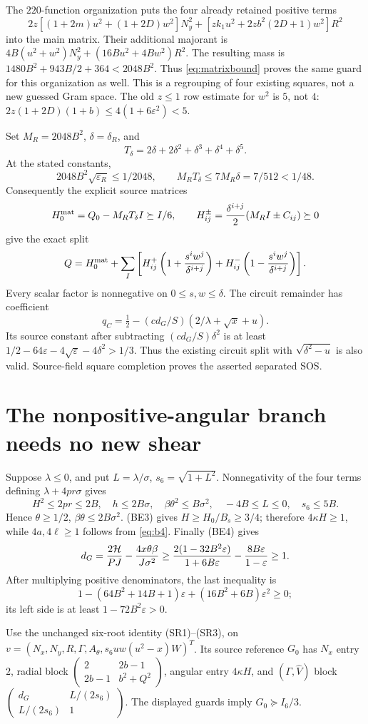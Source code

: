 \documentclass[10pt]{article}
\newcommand{\eps}{\varepsilon}
\begin{document}
The $220$-function organization puts the four already retained
positive terms
\[
 2z[(1+2m)u^2+(1+2D)w^2]N_y^2
       +[zk_1u^2+2zb^2(2D+1)w^2]R^2
\]
into the main matrix. Their additional majorant is
$4B(u^2+w^2)N_y^2+(16Bu^2+4Bw^2)R^2$.
The resulting mass is $1480B^2+943B/2+364<2048B^2$.
Thus \eqref{eq:matrixbound} proves the same guard for this
organization as well. This is a regrouping of four existing squares,
not a new guessed Gram space. The old $z\le1$ row estimate for
$w^2$ is $5$, not $4$:
$2z(1+2D)(1+b)\le4(1+6\eps^2)<5$.

Set $M_R=2048B^2$, $\delta=\delta_R$, and
\[
 T_\delta=2\delta+2\delta^2+\delta^3+\delta^4+\delta^5.
\]
At the stated constants,
\[
 2048B^2\sqrt{\eps_R}\le1/2048,\qquad
 M_RT_\delta\le7M_R\delta=7/512<1/48.
\]
Consequently the explicit source matrices
\[
 H_0^{\rm mat}=Q_0-M_RT_\delta I\succeq I/6,\qquad
 H_{ij}^{\pm}={\delta^{i+j}\over2}(M_RI\pm C_{ij})\succeq0
\]
give the exact split
\[
 Q=H_0^{\rm mat}+\sum_I\left[
 H_{ij}^+\left(1+{s^iw^j\over\delta^{i+j}}\right)
 +H_{ij}^-\left(1-{s^iw^j\over\delta^{i+j}}\right)\right].
\]
Every scalar factor is nonnegative on $0\le s,w\le\delta$.
The circuit remainder has coefficient
\[
 q_C=\tfrac12-(cd_G/S)(2/\lambda+\sqrt x+u).
\]
Its source constant after subtracting $(cd_G/S)\delta^2$ is at least
$1/2-64\eps-4\sqrt\eps-4\delta^2>1/3$. Thus the existing
circuit split with $\sqrt{\delta^2-u}$ is also valid. Source-field
square completion proves the asserted separated SOS.

\section{The nonpositive-angular branch needs no new shear}

Suppose $\lambda\le0$, and put $L=\lambda/\sigma$,
$s_6=\sqrt{1+L^2}$. Nonnegativity of the four terms defining
$\lambda+4pr\sigma$ gives
\[
 H^2\le2pr\le2B,\quad h\le2B\sigma,\quad
 \beta\theta^2\le B\sigma^2,\quad-4B\le L\le0,
 \quad s_6\le5B.
\]
Hence $\theta\ge1/2$, $\beta\theta\le2B\sigma^2$.
(BE3) gives $H\ge H_0/B_s\ge3/4$; therefore
$4\kappa H\ge1$, while $4a,4\ell\ge1$ follows from
\eqref{eq:b4}. Finally (BE4) gives
\[
 d_G={2\mathcal H\over PJ}-{4x\theta\beta\over J\sigma^2}
 \ge {2(1-32B^2\eps)\over1+6B\eps}
                           -{8B\eps\over1-\eps}\ge1.
\]
After multiplying positive denominators, the last inequality is
\[
 1-(64B^2+14B+1)\eps+(16B^2+6B)\eps^2\ge0;
\]
its left side is at least $1-72B^2\eps>0$.

Use the unchanged six-root identity (SR1)--(SR3), on
$v=(N_x,N_y,R,\Gamma,A_\theta,s_6uw(u^2-x)W)^T$.
Its source reference $G_0$ has $N_x$ entry $2$, radial block
$\left(\begin{smallmatrix}2&2b-1\\2b-1&b^2+Q^2\end{smallmatrix}\right)$,
angular entry $4\kappa H$, and $(\Gamma,\widehat V)$ block
$\left(\begin{smallmatrix}d_G&L/(2s_6)\\L/(2s_6)&1\end{smallmatrix}\right)$.
The displayed guards imply $G_0\succeq I_6/3$.
\end{document}
